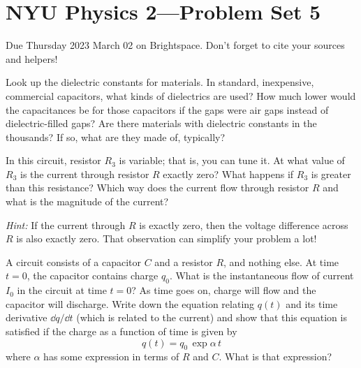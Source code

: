 \documentclass[12pt]{article}
\begin{document}
\section*{NYU Physics 2---Problem Set 5}

Due Thursday 2023 March 02 on Brightspace. Don't forget to cite your sources and helpers!

\startproblem%
Look up the dielectric constants for materials.
In standard, inexpensive, commercial capacitors, what kinds of dielectrics are used?
How much lower would the capacitances be for those capacitors if the gaps were air gaps instead
of dielectric-filled gaps?
Are there materials with dielectric constants in the thousands?
If so, what are they made of, typically?

\startproblem%
In this circuit, resistor $R_3$ is variable; that is, you can tune it. At what value of $R_3$
is the current through resistor $R$ exactly zero? What happens if $R_3$ is
greater than this resistance? Which way does the current flow through resistor $R$ and what is
the magnitude of the current?

\textsl{Hint:} If the current through $R$ is exactly zero,
then the voltage difference across $R$ is also exactly zero.
That observation can simplify your problem a lot!

\startproblem%
A circuit consists of a capacitor $C$ and a resistor $R$,
and nothing else.
At time $t=0$, the capacitor contains charge $q_0$.
What is the instantaneous flow of current $I_0$ in the circuit at time $t=0$?
As time goes on, charge will flow and the capacitor will discharge.
Write down the equation relating $q(t)$ and its time derivative $\dd q/\dd t$ (which
is related to the current) and show that this equation is satisfied if the charge
as a function of time is given by
\begin{equation}
q(t) = q_0\,\exp \alpha\,t
\end{equation}
where $\alpha$ has some expression in terms of $R$ and $C$. What is that expression?
\end{document}
